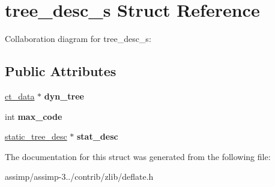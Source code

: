 \hypertarget{structtree__desc__s}{\section{tree\+\_\+desc\+\_\+s Struct Reference}
\label{structtree__desc__s}
}


Collaboration diagram for tree\+\_\+desc\+\_\+s\+:
\subsection*{Public Attributes}
\begin{DoxyCompactItemize}
\item 
\hypertarget{structtree__desc__s_ad3010c1d14af0e1b1ff246efc3b9064e}{\hyperlink{structct__data__s}{ct\+\_\+data} $\ast$ {\bfseries dyn\+\_\+tree}}\label{structtree__desc__s_ad3010c1d14af0e1b1ff246efc3b9064e}

\item 
\hypertarget{structtree__desc__s_a11f42f2c0464693def462dcfdd871002}{int {\bfseries max\+\_\+code}}\label{structtree__desc__s_a11f42f2c0464693def462dcfdd871002}

\item 
\hypertarget{structtree__desc__s_a32bd604e23dc2af123f9a1b548bb6a5a}{\hyperlink{structstatic__tree__desc__s}{static\+\_\+tree\+\_\+desc} $\ast$ {\bfseries stat\+\_\+desc}}\label{structtree__desc__s_a32bd604e23dc2af123f9a1b548bb6a5a}

\end{DoxyCompactItemize}


The documentation for this struct was generated from the following file\+:\begin{DoxyCompactItemize}
\item 
assimp/assimp-\/3../contrib/zlib/deflate.\+h\end{DoxyCompactItemize}
